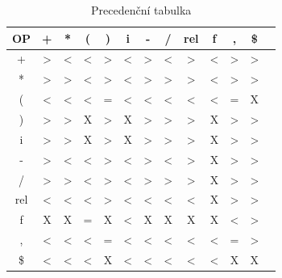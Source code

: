 \documentclass[11pt, a4paper]{article}
\begin{document}
\begin{table}[]
\renewcommand{\arraystretch}{2}
\scriptsize

\centering
\begin{tabular}{ c | c c c c c c c c c c c c } 
OP  & + & * & ( & ) & i & - & / & rel & f & , & \$ \\ \hline
+ & \textgreater & \textless & \textless &  \textgreater & \textless & \textgreater & \textless 
  & \textgreater & \textless  &  \textgreater &  \textgreater   \\ \hline
* & \textgreater & \textgreater & \textless & \textgreater & \textless & \textgreater   
  & \textgreater  & \textgreater  & \textless & \textgreater & \textgreater \\ \hline
( & \textless & \textless & \textless & = & \textless & \textless & \textless & \textless 
   & \textless & = & X \\ \hline
) & \textgreater & \textgreater & X & \textgreater & X & \textgreater & \textgreater 
  & \textgreater  & X & \textgreater & \textgreater \\ \hline
i & \textgreater & \textgreater & X & \textgreater & X & \textgreater & \textgreater 
  & \textgreater & X & \textgreater & \textgreater \\ \hline
- & \textgreater & \textless & \textless & \textgreater & \textless & \textgreater & \textless 
  & \textgreater & X & \textgreater & \textgreater \\ \hline
/ & \textgreater & \textgreater & \textless &  \textgreater & \textless & \textgreater 
  & \textgreater & \textgreater & X & \textgreater & \textgreater \\ \hline
rel & \textless & \textless & \textless & \textgreater & \textless & \textless & \textless 
    &  \textless & X & \textgreater & \textgreater \\ \hline
f   & X & X & = & X & \textless & X & X & X & X & \textless  & \textgreater \\ \hline
, & \textless & \textless & \textless & = & \textless & \textless & \textless & \textless 
  & \textless & = & \textgreater \\ \hline
\$ & \textless & \textless & \textless & X & \textless & \textless & \textless & \textless 
   & \textless & X & X
 
\end{tabular}
\label{tab:3}
\caption{Precedenční tabulka}
\end{table}
\renewcommand{\arraystretch}{1}
\end{document}
